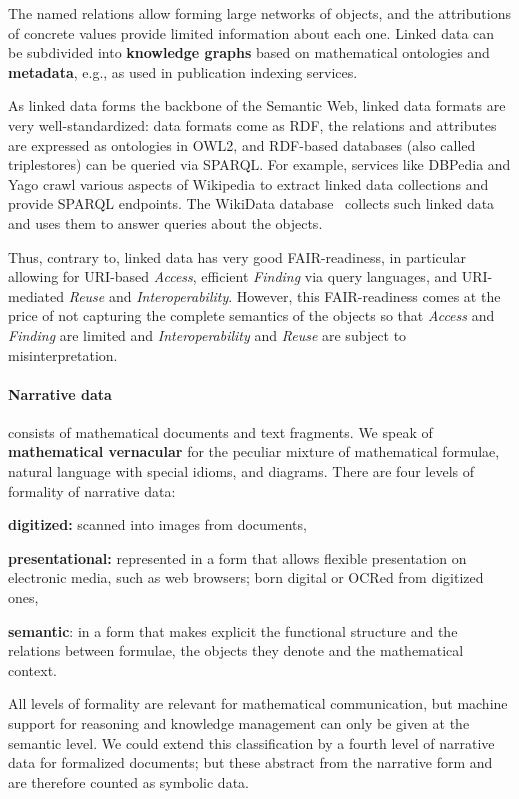 The named relations allow forming large networks of objects, and the attributions of concrete values provide limited information about each one.
Linked data can be subdivided into \textbf{knowledge graphs} based on mathematical ontologies and \textbf{metadata}, e.g., as used in publication indexing services.

As linked data forms the backbone of the Semantic Web, linked data formats are very well-standardized: data formats come as RDF, the relations and attributes are expressed as ontologies in OWL2, and RDF-based databases (also called triplestores) can be queried via SPARQL.
For example, services like DBPedia and Yago crawl various aspects of Wikipedia to extract linked data collections and provide SPARQL endpoints.
The WikiData database~\cite{wikidata:on} collects such linked data and uses them to answer queries about the objects.

Thus, contrary to, linked data has very good FAIR-readiness, in particular allowing for URI-based \emph{Access}, efficient \emph{Finding} via query languages, and URI-mediated \emph{Reuse} and \emph{Interoperability}.
However, this FAIR-readiness comes at the price of not capturing the complete semantics of the objects so that \emph{Access} and \emph{Finding} are limited and \emph{Interoperability} and \emph{Reuse} are subject to misinterpretation.


\paragraph{Narrative data} consists of mathematical documents and text fragments. We speak of \textbf{mathematical vernacular} for the peculiar mixture of mathematical formulae, natural language with special idioms, and diagrams. There are four levels of formality of narrative data:
\begin{compactenum}
\item \textbf{digitized:} scanned into images from documents,
\item \textbf{presentational:} represented in a form that allows flexible
  presentation on electronic media, such as web browsers;
  born digital or OCRed from digitized ones,
\item \textbf{semantic}: in a form that makes explicit the functional structure and the
  relations between formulae, the objects they denote and the mathematical context.
\end{compactenum}
All levels of formality are relevant for mathematical communication, but machine support for reasoning and knowledge management can only be given at the semantic level.
We could extend this classification by a fourth level of narrative data for formalized documents; but these abstract from the narrative form and are therefore counted as symbolic data.

